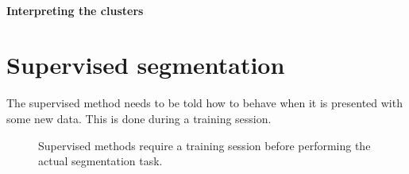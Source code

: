 \documentclass[letterpaper,10pt,english]{sphinxmanual}
\begin{document}
\noindent{}


\subsubsection{Interpreting the clusters}
\label{\detokenize{ML4NeutronImageSegmentation:interpreting-the-clusters}}
\begin{sphinxVerbatim}[commandchars=\\\{\}]
   
\PYG{p}{[}\PYG{p}{]}
\PYG{p}{[}\PYG{p}{]} \PYG{p}{[}\PYG{p}{]} \PYG{p}{[}\PYG{p}{]}\PYG{p}{[}\PYG{p}{]} 
\end{sphinxVerbatim}

\noindent{}


\chapter{Supervised segmentation}
\label{\detokenize{ML4NeutronImageSegmentation:supervised-segmentation}}
The supervised method needs to be told how to behave when it is presented with some new data. This is done during a training session.

\begin{figure}[htbp]
\centering
\capstart

\noindent{}
\caption{Supervised methods require a training session before performing the actual segmentation task.}\label{\detokenize{ML4NeutronImageSegmentation:id12}}\end{figure}
\end{document}
